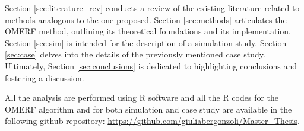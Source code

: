 Section \ref{sec:literature_rev} conducts a review of the existing literature related to methods analogous to the one proposed. Section \ref{sec:methods} articulates the OMERF method, outlining its theoretical foundations and its implementation.  Section \ref{sec:sim} is intended
for the description of a simulation study. Section \ref{sec:case} delves into the details of the previously mentioned case study. Ultimately,  Section \ref{sec:conclusions} is dedicated to highlighting conclusions and fostering a discussion.

All the analysis are performed using R software \cite{rlanguage} and all the R codes for the OMERF algorithm and for both simulation and case study are available in the following github repository: \url{https://github.com/giuliabergonzoli/Master_Thesis}.
